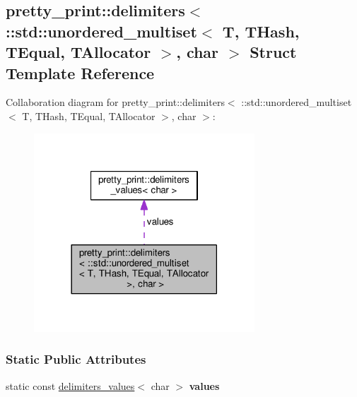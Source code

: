 \hypertarget{structpretty__print_1_1delimiters_3_01_1_1std_1_1unordered__multiset_3_01T_00_01THash_00_01TEqua5962598375835d6c8f207a9a7f10e137}{}\subsection{pretty\+\_\+print\+:\+:delimiters$<$ \+:\+:std\+:\+:unordered\+\_\+multiset$<$ T, T\+Hash, T\+Equal, T\+Allocator $>$, char $>$ Struct Template Reference}
\label{structpretty__print_1_1delimiters_3_01_1_1std_1_1unordered__multiset_3_01T_00_01THash_00_01TEqua5962598375835d6c8f207a9a7f10e137}


Collaboration diagram for pretty\+\_\+print\+:\+:delimiters$<$ \+:\+:std\+:\+:unordered\+\_\+multiset$<$ T, T\+Hash, T\+Equal, T\+Allocator $>$, char $>$\+:\nopagebreak
\begin{figure}[H]
\begin{center}
\leavevmode
\includegraphics[width=234pt]{structpretty__print_1_1delimiters_3_01_1_1std_1_1unordered__multiset_3_01T_00_01THash_00_01TEqua8bcba5c078f9f6f856bdb7ee0d7e8272}
\end{center}
\end{figure}
\subsubsection*{Static Public Attributes}
\begin{DoxyCompactItemize}
\item 
static const \hyperlink{structpretty__print_1_1delimiters__values}{delimiters\+\_\+values}$<$ char $>$ {\bfseries values}\hypertarget{structpretty__print_1_1delimiters_3_01_1_1std_1_1unordered__multiset_3_01T_00_01THash_00_01TEqua5962598375835d6c8f207a9a7f10e137_aeed4005717413153ee04d74e514ba081}{}\label{structpretty__print_1_1delimiters_3_01_1_1std_1_1unordered__multiset_3_01T_00_01THash_00_01TEqua5962598375835d6c8f207a9a7f10e137_aeed4005717413153ee04d74e514ba081}

\end{DoxyCompactItemize}


